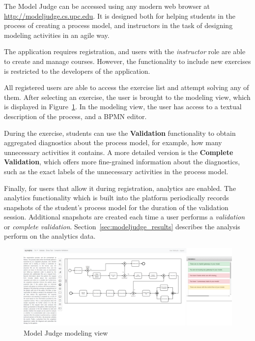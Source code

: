 The Model Judge can be accessed using any modern web browser at
\url{http://modeljudge.cs.upc.edu}. It is designed both for helping students in
the process of creating a process model, and instructors in the task of
designing modeling activities in an agile way. 

The application requires registration, and users with the \emph{instructor} role
are able to create and manage courses. However, the functionality to include new
exercises is restricted to the developers of the application.

All registered users are able to access the exercise list and attempt solving
any of them. After selecting an exercise, the user is brought to the modeling
view, which is displayed in Figure~\ref{fig:modeljudge_validation}. In the modeling view,
the user has access to a textual description of the process, and a BPMN editor.

During the exercise, students can use the \textbf{Validation} functionality to
obtain aggregated diagnostics about the process model, for example, how many
unnecessary activities it contains. A more detailed version is the \textbf{Complete
  Validation}, which offers more fine-grained information about the diagnostics,
such as the exact labels of the unnecessary activities in the process model.

Finally, for users that allow it during registration, analytics are enabled. The
analytics functionality which is built into the platform periodically records
snapshots of the student's process model for the duration of the validation
session. Additional snapshots are created each time a user performs a
\textit{validation} or \textit{complete validation}.
Section~\ref{sec:modeljudge_results} describes the analysis perform on the
analytics data.

\begin{figure}[htb]
  \centering
  \includegraphics[width=\textwidth]{figures/validation}
  \caption{Model Judge modeling view}
  \label{fig:modeljudge_validation}
\end{figure}





